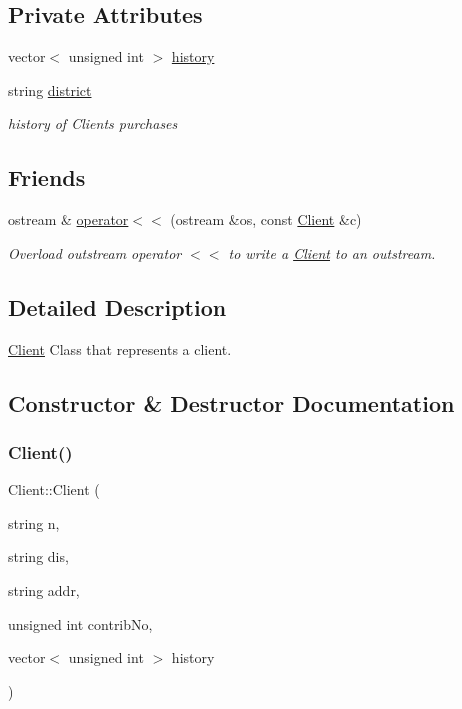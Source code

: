 \subsection*{Private Attributes}
\begin{DoxyCompactItemize}
\item 
vector$<$ unsigned int $>$ \hyperlink{classClient_afceda4b2e1aa4cf7cb52478d5e679bad}{history}
\item 
string \hyperlink{classClient_a4f613c8876f65ad3de6435efc3e9f6a2}{district}
\begin{DoxyCompactList}\small\item\em history of Clients purchases \end{DoxyCompactList}\end{DoxyCompactItemize}
\subsection*{Friends}
\begin{DoxyCompactItemize}
\item 
ostream \& \hyperlink{classClient_ae8980b59fbd6f02e9ebd291446c37bef}{operator$<$$<$} (ostream \&os, const \hyperlink{classClient}{Client} \&c)
\begin{DoxyCompactList}\small\item\em Overload outstream operator $<$$<$ to write a \hyperlink{classClient}{Client} to an outstream. \end{DoxyCompactList}\end{DoxyCompactItemize}


\subsection{Detailed Description}
\hyperlink{classClient}{Client} Class that represents a client. 

\subsection{Constructor \& Destructor Documentation}
\mbox{\label{classClient_ae054d039da064a80f3bde9e126a58e23}} 
\subsubsection{\texorpdfstring{Client()}{Client()}\hspace{0.1cm}{\footnotesize\ttfamily [1/3]}}
{\footnotesize\ttfamily Client\+::\+Client (\begin{DoxyParamCaption}\item[{string}]{n,  }\item[{string}]{dis,  }\item[{string}]{addr,  }\item[{unsigned int}]{contrib\+No,  }\item[{vector$<$ unsigned int $>$}]{history }\end{DoxyParamCaption})}



